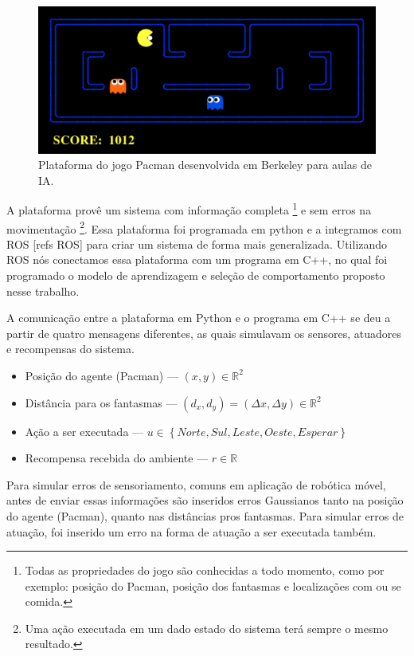 \begin{figure}[H]
    \centering
    \includegraphics[width=120mm]{images/pacman_platform}
    \caption{\label{img:PlataformaSimulacaoPacman}Plataforma do jogo Pacman desenvolvida em Berkeley para aulas de IA.}
\end{figure}

A plataforma provê um sistema com informação completa%
\footnote{Todas as propriedades do jogo são conhecidas a todo momento, como por exemplo: posição do Pacman, posição dos fantasmas e localizações com ou se comida.%
} e sem erros na movimentação%
\footnote{Uma ação executada em um dado estado do sistema terá sempre o mesmo resultado.%
}. Essa plataforma foi programada em python e a integramos com ROS [refs ROS] para criar um sistema de forma mais generalizada. Utilizando ROS nós conectamos essa plataforma com um programa em C++, no qual foi programado o modelo de aprendizagem e seleção de comportamento proposto nesse trabalho.

A comunicação entre a plataforma em Python e o programa em C++ se deu a partir de quatro mensagens diferentes, as quais simulavam os sensores, atuadores e recompensas do sistema.

\begin{itemize}
	\item Posição do agente (Pacman) --- $ \left( x, y \right) \in \mathbb{R}^2 $
	\item Distância para os fantasmas --- $ \left( d_x, d_y \right) = \left( \Delta x, \Delta y \right) \in \mathbb{R}^2 $
	\item Ação a ser executada --- $ u \in \left\{Norte, Sul, Leste, Oeste, Esperar \right\} $
	\item Recompensa recebida do ambiente --- $ r \in \mathbb{R} $
\end{itemize}

Para simular erros de sensoriamento, comuns em aplicação de robótica móvel, antes de enviar essas informações são inseridos erros Gaussianos tanto na posição do agente (Pacman), quanto nas distâncias pros fantasmas. Para simular erros de atuação, foi inserido um erro na forma de atuação a ser executada também.

